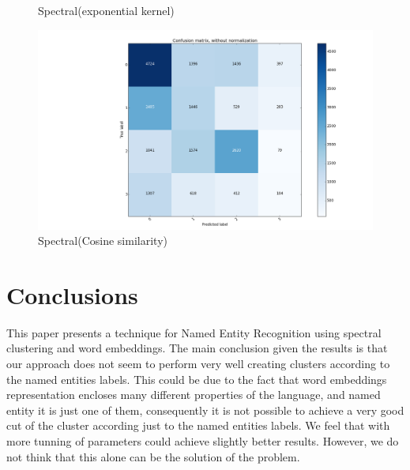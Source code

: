 \documentclass[]{article}
\begin{document}
\begin{figure}
\begin{minipage}[b]{0.5\linewidth}
			\caption{Spectral(exponential kernel)} 
			\vspace{4ex}
		\end{minipage}%
		\begin{minipage}[b]{0.5\linewidth}
			\centering
			\includegraphics[width=1\linewidth]{Figures_Mik/cosSimConfMat2.png} 
			\caption{Spectral(Cosine similarity)} 
			\vspace{4ex}
		\end{minipage} 
	\end{figure}
	
	
	\section{Conclusions}
	This paper presents a technique for Named Entity Recognition using spectral clustering and word embeddings. The main conclusion given the results is that our approach does not seem to perform very well creating clusters according to the named entities labels. This could be due to the fact that word embeddings representation encloses many different properties of the language, and named entity it is just one of them, consequently it is not possible to achieve a very good cut of the cluster according just to the named entities labels. We feel that with more tunning of parameters could achieve slightly better results. However, we do not think that this alone can be the solution of the problem. 
	
	
	

	
	\pagestyle{myheadings}
	\thispagestyle{plain}
	
\end{document}
